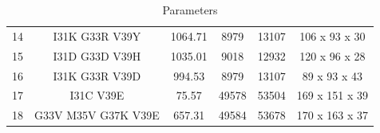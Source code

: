 \begin{table}[ht]
{\begin{tabular}{|c|ccccc|}
  14 & I31K G33R V39Y         & 1064.71     & 8979         & 13107     & 106 x 93  x 30     \\ %
  15 & I31D G33D V39H         & 1035.01     & 9018         & 12932     & 120 x 96  x 28     \\ %
  16 & I31K G33R V39D         & 994.53     & 8979         & 13107     & 89  x 93  x 43     \\ %
  17 & I31C V39E             & 75.57     & 49578     & 53504     & 169 x 151 x 39     \\ %
  18 & G33V M35V G37K V39E     & 657.31     & 49584     & 53678     & 170 x 163 x 37     \\ %
  \hline
  \end{tabular}
  }
  \caption{
  Parameters
  }
  \label{tab:p02ch01t1}
\end{table}


